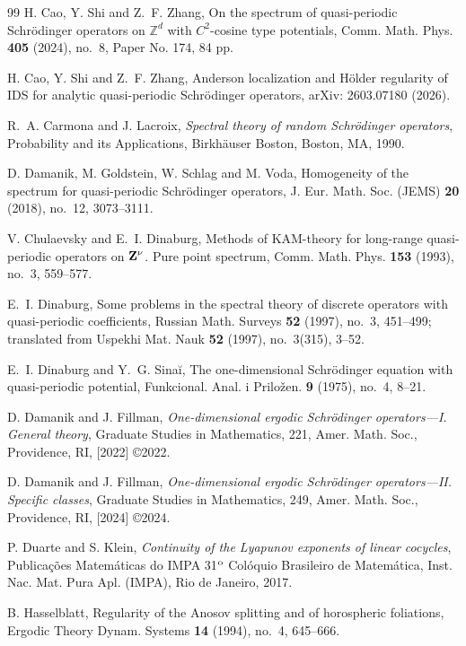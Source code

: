 \documentclass[reqno,11pt]{amsart}
\begin{document}
\begin{thebibliography}{99}
H. Cao, Y. Shi and Z.~F. Zhang, On the spectrum of quasi-periodic Schr\"odinger operators on $\mathbb Z^d$ with $C^2$-cosine type potentials, Comm. Math. Phys. {\bf 405} (2024), no.~8, Paper No. 174, 84 pp.


H. Cao, Y. Shi and Z.~F. Zhang, Anderson localization and H\"older regularity of IDS for analytic quasi-periodic Schr\"odinger operators, arXiv: 2603.07180 (2026).

R.~A. Carmona and J. Lacroix, {\it Spectral theory of random Schr\"odinger operators}, Probability and its Applications, Birkh\"auser Boston, Boston, MA, 1990.

D. Damanik, M. Goldstein, W. Schlag and M. Voda, Homogeneity of the spectrum for quasi-periodic Schr\"odinger operators, J. Eur. Math. Soc. (JEMS) {\bf 20} (2018), no.~12, 3073--3111.

V. Chulaevsky and E.~I. Dinaburg, Methods of KAM-theory for long-range quasi-periodic operators on ${\bf Z}^\nu$. Pure point spectrum, Comm. Math. Phys. {\bf 153} (1993), no.~3, 559--577.

E.~I. Dinaburg, Some problems in the spectral theory of discrete operators with
   quasi-periodic coefficients, Russian Math. Surveys {\bf 52} (1997), no.~3, 451--499; translated from Uspekhi Mat. Nauk {\bf 52} (1997), no.~3(315), 3--52.

   
E.~I. Dinaburg and Y.~G. Sina\u i, The one-dimensional Schr\"odinger equation with quasi-periodic potential, Funkcional. Anal. i Prilo\v zen. {\bf 9} (1975), no.~4, 8--21.

D. Damanik and J. Fillman, {\it One-dimensional ergodic Schr\"odinger operators---I. General theory}, Graduate Studies in Mathematics, 221, Amer. Math. Soc., Providence, RI, [2022] \copyright 2022.

D. Damanik and J. Fillman, {\it One-dimensional ergodic Schr\"odinger operators---II. Specific classes}, Graduate Studies in Mathematics, 249, Amer. Math. Soc., Providence, RI, [2024] \copyright 2024.



   P. Duarte and S. Klein, {\it Continuity of the Lyapunov exponents of linear cocycles}, Publica\c c\~oes Matem\'aticas do IMPA 31$\sp {\rm o}$ Col\'oquio Brasileiro de Matem\'atica, Inst. Nac. Mat. Pura Apl. (IMPA), Rio de Janeiro, 2017.

B. Hasselblatt, Regularity of the Anosov splitting and of horospheric foliations, Ergodic Theory Dynam. Systems {\bf 14} (1994), no.~4, 645--666.




\end{thebibliography}
\end{document}
